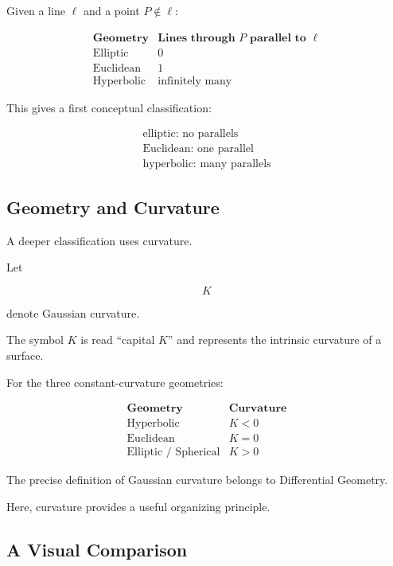 Given a line \(\ell\) and a point \(P\notin\ell\):

\[
\begin{array}{c|c}
\textbf{Geometry} & \textbf{Lines through \(P\) parallel to \(\ell\)}\\
\hline
\text{Elliptic} & 0\\
\text{Euclidean} & 1\\
\text{Hyperbolic} & \text{infinitely many}
\end{array}
\]

This gives a first conceptual classification:

\[
\boxed{
\begin{array}{c}
\text{elliptic: no parallels}\\[2mm]
\text{Euclidean: one parallel}\\[2mm]
\text{hyperbolic: many parallels}
\end{array}
}
\]

\subsection{Geometry and Curvature}
\label{subsec:geometry-and-curvature}

A deeper classification uses curvature.

Let

\[
K
\]

denote Gaussian curvature.

The symbol \(K\) is read ``capital \(K\)'' and represents the intrinsic
curvature of a surface.

For the three constant-curvature geometries:

\[
\boxed{
\begin{array}{c|c}
\textbf{Geometry} & \textbf{Curvature}\\
\hline
\text{Hyperbolic} & K<0\\
\text{Euclidean} & K=0\\
\text{Elliptic / Spherical} & K>0
\end{array}
}
\]

The precise definition of Gaussian curvature belongs to Differential
Geometry.

Here, curvature provides a useful organizing principle.

\subsection{A Visual Comparison}
\label{subsec:curvature-visual-comparison}

